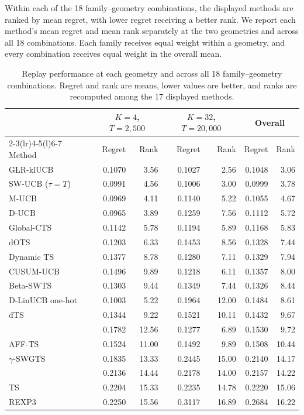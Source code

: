 Within each of the 18 family--geometry combinations, the displayed methods are
ranked by mean regret, with lower regret receiving a better rank.
We report each method's mean regret and mean rank separately at the two
geometries and across all 18 combinations.
Each family receives equal weight within a geometry, and every combination
receives equal weight in the overall mean.

\begin{table}[H]
\centering
\footnotesize
\setlength{\tabcolsep}{3.5pt}
\caption{Replay performance at each geometry and across all 18
family--geometry combinations. Regret and rank are means, lower values are
better, and ranks are recomputed among the 17 displayed methods.}
\label{tab:literature-ranks}
\begin{tabular}{@{}lrrrrrr@{}}
\toprule
& \multicolumn{2}{c}{$K=4$, $T=2{,}500$}
& \multicolumn{2}{c}{$K=32$, $T=20{,}000$}
& \multicolumn{2}{c}{Overall} \\
\cmidrule(lr){2-3}\cmidrule(lr){4-5}\cmidrule(l){6-7}
Method & Regret & Rank & Regret & Rank & Regret & Rank \\
\midrule
GLR-klUCB        & 0.1070 & 3.56  & 0.1027 & 2.56  & 0.1048 & 3.06 \\
SW-UCB ($\tau=T$) & 0.0991 & 4.56  & 0.1006 & 3.00  & 0.0999 & 3.78 \\
M-UCB            & 0.0969 & 4.11  & 0.1140 & 5.22  & 0.1055 & 4.67 \\
D-UCB            & 0.0965 & 3.89  & 0.1259 & 7.56  & 0.1112 & 5.72 \\
Global-CTS       & 0.1142 & 5.78  & 0.1194 & 5.89  & 0.1168 & 5.83 \\
dOTS             & 0.1203 & 6.33  & 0.1453 & 8.56  & 0.1328 & 7.44 \\
Dynamic TS       & 0.1377 & 8.78  & 0.1280 & 7.11  & 0.1329 & 7.94 \\
CUSUM-UCB        & 0.1496 & 9.89  & 0.1218 & 6.11  & 0.1357 & 8.00 \\
Beta-SWTS        & 0.1303 & 9.44  & 0.1349 & 7.44  & 0.1326 & 8.44 \\
D-LinUCB one-hot & 0.1003 & 5.22  & 0.1964 & 12.00 & 0.1484 & 8.61 \\
dTS              & 0.1344 & 9.22  & 0.1521 & 10.11 & 0.1432 & 9.67 \\
\method{}        & 0.1782 & 12.56 & 0.1277 & 6.89  & 0.1530 & 9.72 \\
AFF-TS           & 0.1524 & 11.00 & 0.1492 & 9.89  & 0.1508 & 10.44 \\
$\gamma$-SWGTS   & 0.1835 & 13.33 & 0.2445 & 15.00 & 0.2140 & 14.17 \\
\anchor{}        & 0.2136 & 14.44 & 0.2178 & 14.00 & 0.2157 & 14.22 \\
TS               & 0.2204 & 15.33 & 0.2235 & 14.78 & 0.2220 & 15.06 \\
REXP3            & 0.2250 & 15.56 & 0.3117 & 16.89 & 0.2684 & 16.22 \\
\bottomrule
\end{tabular}
\end{table}

